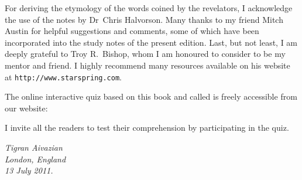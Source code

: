 For deriving the etymology of the words coined by the revelators, I acknowledge the use of the notes by Dr~Chris Halvorson.
Many thanks to my friend Mitch Austin for helpful suggestions and comments, some of which have been incorporated into the study notes of the present edition.
Last, but not least, I am deeply grateful to Troy R.~Bishop, whom I am honoured to consider to be my mentor and friend.
I highly recommend many resources available on his website at \texttt{http://www.starspring.com}.

The online interactive quiz based on this book and called  is freely accessible from our website:

\begin{center}
\end{center}

I invite all the readers to test their comprehension by participating in the quiz.

\begin{flushleft}
\itshape
\hspace*{6pt}Tigran Aivazian\\
\hspace*{6pt}London, England\\
\hspace*{6pt}13 July 2011.\\
\end{flushleft}
